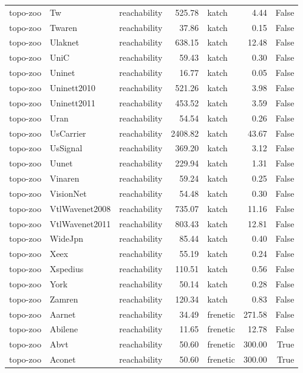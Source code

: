 \begin{tabular}{lllrlrr}
topo-zoo & Tw & reachability & 525.78 & katch & 4.44 & False \\
topo-zoo & Twaren & reachability & 37.86 & katch & 0.15 & False \\
topo-zoo & Ulaknet & reachability & 638.15 & katch & 12.48 & False \\
topo-zoo & UniC & reachability & 59.43 & katch & 0.30 & False \\
topo-zoo & Uninet & reachability & 16.77 & katch & 0.05 & False \\
topo-zoo & Uninett2010 & reachability & 521.26 & katch & 3.98 & False \\
topo-zoo & Uninett2011 & reachability & 453.52 & katch & 3.59 & False \\
topo-zoo & Uran & reachability & 54.54 & katch & 0.26 & False \\
topo-zoo & UsCarrier & reachability & 2408.82 & katch & 43.67 & False \\
topo-zoo & UsSignal & reachability & 369.20 & katch & 3.12 & False \\
topo-zoo & Uunet & reachability & 229.94 & katch & 1.31 & False \\
topo-zoo & Vinaren & reachability & 59.24 & katch & 0.25 & False \\
topo-zoo & VisionNet & reachability & 54.48 & katch & 0.30 & False \\
topo-zoo & VtlWavenet2008 & reachability & 735.07 & katch & 11.16 & False \\
topo-zoo & VtlWavenet2011 & reachability & 803.43 & katch & 12.81 & False \\
topo-zoo & WideJpn & reachability & 85.44 & katch & 0.40 & False \\
topo-zoo & Xeex & reachability & 55.19 & katch & 0.24 & False \\
topo-zoo & Xspedius & reachability & 110.51 & katch & 0.56 & False \\
topo-zoo & York & reachability & 50.14 & katch & 0.28 & False \\
topo-zoo & Zamren & reachability & 120.34 & katch & 0.83 & False \\
topo-zoo & Aarnet & reachability & 34.49 & frenetic & 271.58 & False \\
topo-zoo & Abilene & reachability & 11.65 & frenetic & 12.78 & False \\
topo-zoo & Abvt & reachability & 50.60 & frenetic & 300.00 & True \\
topo-zoo & Aconet & reachability & 50.60 & frenetic & 300.00 & True \\

\end{tabular}
